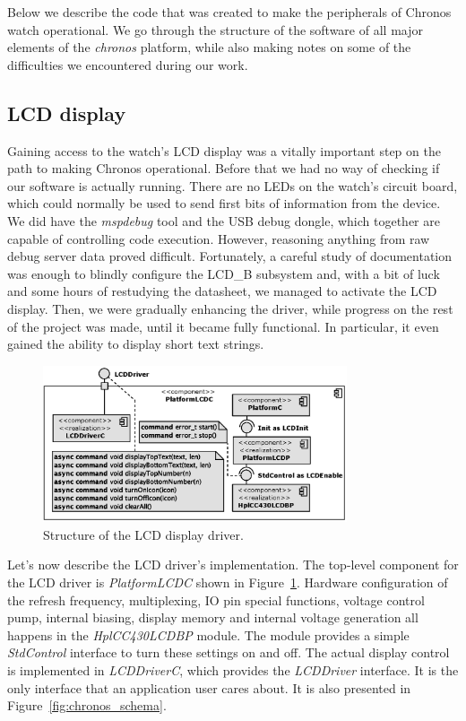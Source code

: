 Below we describe the code that was created to make the peripherals of Chronos watch operational. We go through the structure of the software of all major elements of the \emph{chronos} platform, while also making notes on some of the difficulties we encountered during our work.

\subsection{LCD display}
Gaining access to the watch's LCD display was a vitally important step on the path to making Chronos operational.  Before that we had no way of checking if our software is actually running. There are no LEDs on the watch's circuit board, which could normally be used to send first bits of information from the device. We did have the \emph{mspdebug} tool and the USB debug dongle, which together are capable of controlling code execution. However, reasoning anything from raw debug server data proved difficult. Fortunately, a careful study of documentation was enough to blindly configure the LCD\_B subsystem and, with a bit of luck and some hours of restudying the datasheet, we managed to activate the LCD display. Then, we were gradually enhancing the driver, while progress on the rest of the project was made, until it became fully functional. In particular, it even gained the ability to display short text strings.

\begin{figure}[h]
  \centering
  \includegraphics[width=0.8\textwidth]{diagrams/platform_lcd_c.eps}
  \caption{Structure of the LCD display driver.}
  \label{fig:platformc_lcd_c}
\end{figure}
Let's now describe the LCD driver's implementation. The top-level component for the LCD driver is \emph{PlatformLCDC} shown in Figure~\ref{fig:platformc_lcd_c}.
Hardware configuration of the refresh frequency, multiplexing, IO pin special functions, voltage control pump, internal biasing, display memory and internal voltage generation all happens in the \emph{HplCC430LCDBP} module. The module provides a simple \emph{StdControl} interface to turn these settings on and off. The actual display control is implemented in \emph{LCDDriverC}, which provides the \emph{LCDDriver} interface. It is the only interface that an application user cares about. It is also presented in Figure~\ref{fig:chronos_schema}.

